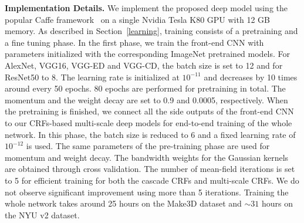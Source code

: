\documentclass[10pt,twocolumn,letterpaper]{article}
\begin{document}
\textbf{Implementation Details.}
We implement the proposed deep model using the popular Caffe framework~\cite{jia2014caffe} on a single Nvidia Tesla K80 GPU with 12 GB memory. 
As described in Section~\ref{learning}, training consists of a pretraining and a fine tuning phase. In the first phase, we train the front-end CNN with parameters initialized with the corresponding ImageNet pretrained models. For AlexNet, VGG16, VGG-ED and VGG-CD, the batch size is set to 12 and for ResNet50 to 8. 
The learning rate is initialized at $10^{-11}$ and decreases by 10 times around every 50 epochs. 80 epochs are performed for pretraining in total. 
The momentum and the weight decay are set to 0.9 and 0.0005, respectively. 
{When the pretraining is finished, we connect all the side outputs of the front-end CNN to our CRFs-based multi-scale deep models 
for end-to-end training of the whole network.} In this phase, the batch size is reduced to 6 and a fixed 
learning rate of $10^{-12}$ is used. The same parameters of the pre-training phase are 
used for momentum and weight decay. The bandwidth weights for the Gaussian kernels are obtained 
through cross validation. {The number of mean-field iterations is set to 5 for efficient training for both 
the cascade CRFs and multi-scale CRFs. We do not observe significant improvement using more than 5 iterations.} 
Training the whole network takes around 25 hours on the Make3D dataset and $\sim 31$ hours on the NYU v2 dataset. 
\end{document}
